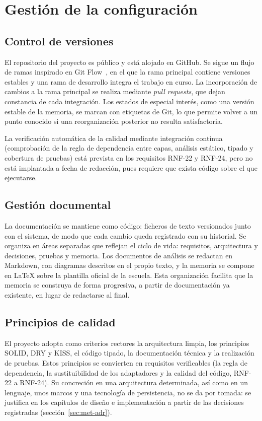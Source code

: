 \section{Gestión de la configuración}
\label{sec:met-git}

\subsection{Control de versiones}

El repositorio del proyecto es público y está alojado en GitHub. Se sigue un flujo de ramas inspirado en Git Flow~\cite{driessen2010gitflow}, en el que la rama principal contiene versiones estables y una rama de desarrollo integra el trabajo en curso. La incorporación de cambios a la rama principal se realiza mediante \emph{pull requests}, que dejan constancia de cada integración. Los estados de especial interés, como una versión estable de la memoria, se marcan con etiquetas de Git, lo que permite volver a un punto conocido si una reorganización posterior no resulta satisfactoria.

La verificación automática de la calidad mediante integración continua (comprobación de la regla de dependencia entre capas, análisis estático, tipado y cobertura de pruebas) está prevista en los requisitos RNF-22 y RNF-24, pero no está implantada a fecha de redacción, pues requiere que exista código sobre el que ejecutarse.

\subsection{Gestión documental}

La documentación se mantiene como código: ficheros de texto versionados junto con el sistema, de modo que cada cambio queda registrado con su historial. Se organiza en áreas separadas que reflejan el ciclo de vida: requisitos, arquitectura y decisiones, pruebas y memoria. Los documentos de análisis se redactan en Markdown, con diagramas descritos en el propio texto, y la memoria se compone en \LaTeX{} sobre la plantilla oficial de la escuela. Esta organización facilita que la memoria se construya de forma progresiva, a partir de documentación ya existente, en lugar de redactarse al final.

\subsection{Principios de calidad}

El proyecto adopta como criterios rectores la arquitectura limpia, los principios SOLID, DRY y KISS, el código tipado, la documentación técnica y la realización de pruebas. Estos principios se convierten en requisitos verificables (la regla de dependencia, la sustituibilidad de los adaptadores y la calidad del código, RNF-22 a RNF-24). Su concreción en una arquitectura determinada, así como en un lenguaje, unos marcos y una tecnología de persistencia, no se da por tomada: se justifica en los capítulos de diseño e implementación a partir de las decisiones registradas (sección~\ref{sec:met-adr}).

